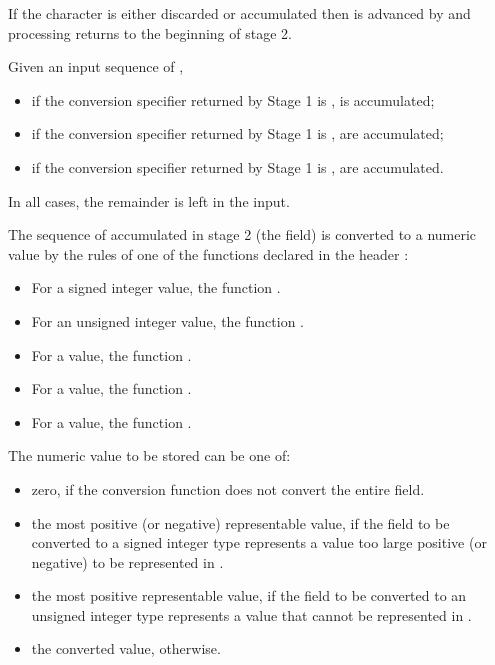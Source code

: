 \begin{itemdescr}
\begin{description}
If the character is either discarded or accumulated
then  is advanced by 
and processing returns to the beginning of stage 2.

\begin{example}
Given an input sequence of ,
\begin{itemize}
\item
if the conversion specifier returned by Stage 1 is ,
 is accumulated;
\item
if the conversion specifier returned by Stage 1 is ,
 are accumulated;
\item
if the conversion specifier returned by Stage 1 is ,
 are accumulated.
\end{itemize}
In all cases, the remainder is left in the input.
\end{example}

The sequence of  accumulated in stage 2 (the field)
is converted to a numeric value by the rules of one of the functions
declared in the header :

\begin{itemize}
\item
For a signed integer value, the function .
\item
For an unsigned integer value, the function .
\item
For a  value, the function .
\item
For a  value, the function .
\item
For a  value, the function .
\end{itemize}

The numeric value to be stored can be one of:
\begin{itemize}
\item
zero, if the conversion function does not convert the entire field.
\item
the most positive (or negative) representable value,
if the field to be converted to a signed integer type represents a value
too large positive (or negative) to be represented in .
\item
the most positive representable value,
if the field to be converted to an unsigned integer type represents a value
that cannot be represented in .
\item
the converted value, otherwise.
\end{itemize}


\end{description}
\end{itemdescr}
